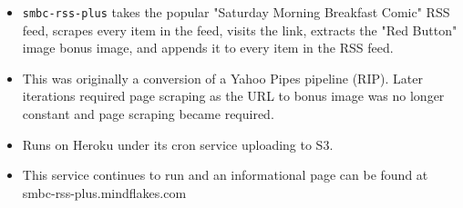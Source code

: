 \documentclass[10pt,letter,ragged2e]{altacv}
\begin{document}
\begin{paracol}{2}

\divider


\begin{itemize}
\item \texttt{smbc-rss-plus} takes the popular "Saturday Morning Breakfast Comic" RSS feed, scrapes every item in the feed, visits the link, extracts the "Red Button" image bonus image, and appends it to every item in the RSS feed.
\item This was originally a conversion of a Yahoo Pipes pipeline (RIP). Later iterations required page scraping as the URL to bonus image was no longer constant and page scraping became required.
\item Runs on Heroku under its cron service uploading to S3.
\item This service continues to run and an informational page can be found at smbc-rss-plus.mindflakes.com
\end{itemize}






\end{paracol}
\end{document}
